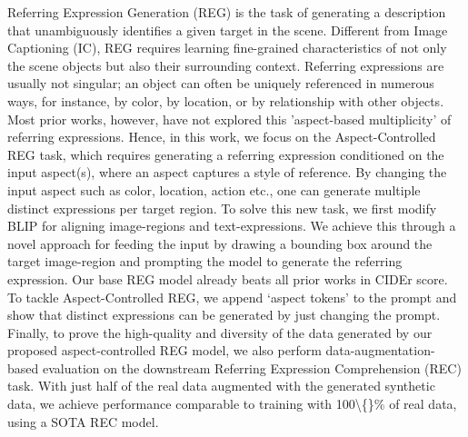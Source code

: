 Referring Expression Generation (REG) is the task of generating a description that unambiguously identifies a given target in the scene. Different from Image Captioning (IC), REG requires learning fine-grained characteristics of not only the scene objects but also their surrounding context. Referring expressions are usually not singular; an object can often be uniquely referenced in numerous ways, for instance, by color, by location, or by relationship with other objects. Most prior works, however, have not explored this 'aspect-based multiplicity' of referring expressions. Hence, in this work, we focus on the Aspect-Controlled REG task, which requires generating a referring expression conditioned on the input aspect(s), where an aspect captures a style of reference. By changing the input aspect such as color, location, action etc., one can generate multiple distinct expressions per target region. To solve this new task, we first modify BLIP for aligning image-regions and text-expressions. We achieve this through a novel approach for feeding the input by drawing a bounding box around the target image-region and prompting the model to generate the referring expression. Our base REG model already beats all prior works in CIDEr score. To tackle Aspect-Controlled REG, we append `aspect tokens' to the prompt and show that distinct expressions can be generated by just changing the prompt. Finally, to prove the high-quality and diversity of the data generated by our proposed aspect-controlled REG model, we also perform data-augmentation-based evaluation on the downstream Referring Expression Comprehension (REC) task. With just half of the real data augmented with the generated synthetic data, we achieve performance comparable to training with 100\textbackslash\{\}\% of real data, using a SOTA REC model.